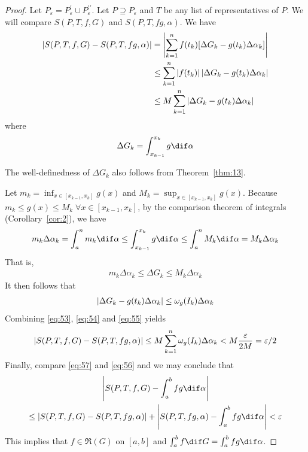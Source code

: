 \documentclass[thmcnt=section, color=blue, 12pt]{my-elegantbook}
\begin{document}
\begin{proof}
	Let $P_\varepsilon = P^\prime_\varepsilon \cup P^{\prime\prime}_\varepsilon$.
	Let $P \supseteq P_\varepsilon$ and $T$ be any list of representatives of $P$.
	We will compare $S(P, T, f, G)$ and $S(P, T, fg, \alpha)$.
	We have
	\begin{align}
		\left\lvert S(P, T, f, G) - S(P, T, fg, \alpha) \right\rvert
		 & = \left\lvert \sum_{k=1}^n f(t_k) [\Delta G_k - g(t_k) \Delta \alpha_k] \right\rvert     \nonumber    \\
		 & \leq \sum_{k=1}^n \left\lvert f(t_k) \right\rvert \left\lvert \Delta G_k - g(t_k) \Delta \alpha_k \right\rvert \nonumber \\
		 & \leq M \sum_{k=1}^n \left\lvert \Delta G_k - g(t_k) \Delta \alpha_k \right\rvert
		\label{eq:53}
	\end{align}
	where
	\begin{align*}
		\Delta G_k = \int_{x_{k-1}}^{x_k} g \dif \alpha
	\end{align*}
	\begin{note}
		The well-definedness of $\Delta G_k$ also follows from Theorem~\ref{thm:13}.
	\end{note}
	Let $m_k = \inf_{x \in [x_{k-1}, x_k]} g(x)$
	and $M_k = \sup_{x \in [x_{k-1}, x_k]} g(x)$.
	Because $m_k \leq g(x) \leq M_k \; \forall x \in [x_{k-1}, x_k]$,
	by the comparison theorem of integrals (Corollary~\ref{cor:2}),
	we have
	\begin{align*}
		m_k \Delta \alpha_k
		= \int_a^n m_k \dif \alpha
		\leq \int_{x_{k-1}}^{x_k} g \dif \alpha
		\leq \int_a^n M_k \dif \alpha
		= M_k \Delta \alpha_k
	\end{align*}
	That is,
	\begin{align*}
		m_k \Delta \alpha_k \leq \Delta G_k \leq M_k \Delta \alpha_k
	\end{align*}
	It then follows that
	\begin{align}
		\left\lvert \Delta G_k - g(t_k) \Delta \alpha_k \right\rvert \leq \omega_g(I_k) \Delta \alpha_k
		\label{eq:54}
	\end{align}
	Combining \eqref{eq:53},  \eqref{eq:54} and \eqref{eq:55} yields
	\begin{align}
		\left\lvert S(P, T, f, G) - S(P, T, fg, \alpha) \right\rvert
		\leq M \sum_{k=1}^n \omega_g(I_k) \Delta \alpha_k
		< M \frac{\varepsilon}{2M}
		=\varepsilon / 2
		\label{eq:57}
	\end{align}
	Finally, compare \eqref{eq:57} and \eqref{eq:56} and we may conclude that
	\begin{multline*}
		\abs{S(P, T, f, G) - \int_a^b f g \dif \alpha} \\
		\leq \abs{S(P, T, f, G) - S(P, T, fg, \alpha)}
		+ \abs{S(P, T, fg, \alpha)-  \int_a^b f g \dif \alpha}
		< \varepsilon
	\end{multline*}
	This implies that $f \in \mathfrak{R}(G)$ on $[a, b]$
	and $\int_a^b f \dif G = \int_a^b f g \dif \alpha$.
\end{proof}
\end{document}
